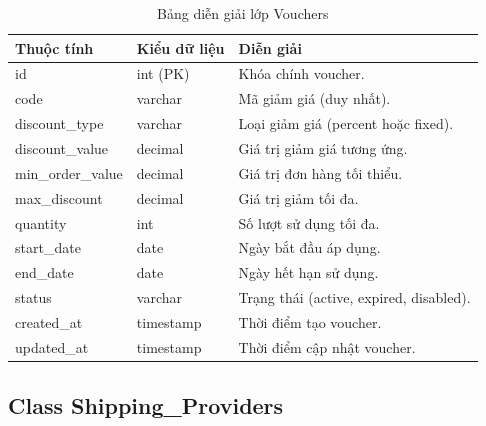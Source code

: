 \begin{table}[H]
\centering
\caption{Bảng diễn giải lớp Vouchers}
\label{tab:vouchers}
\begin{tabular}{|l|l|p{7cm}|}
\hline
\textbf{Thuộc tính} & \textbf{Kiểu dữ liệu} & \textbf{Diễn giải} \\ \hline
id & int (PK) & Khóa chính voucher. \\ \hline
code & varchar & Mã giảm giá (duy nhất). \\ \hline
discount\_type & varchar & Loại giảm giá (percent hoặc fixed). \\ \hline
discount\_value & decimal & Giá trị giảm giá tương ứng. \\ \hline
min\_order\_value & decimal & Giá trị đơn hàng tối thiểu. \\ \hline
max\_discount & decimal & Giá trị giảm tối đa. \\ \hline
quantity & int & Số lượt sử dụng tối đa. \\ \hline
start\_date & date & Ngày bắt đầu áp dụng. \\ \hline
end\_date & date & Ngày hết hạn sử dụng. \\ \hline
status & varchar & Trạng thái (active, expired, disabled). \\ \hline
created\_at & timestamp & Thời điểm tạo voucher. \\ \hline
updated\_at & timestamp & Thời điểm cập nhật voucher. \\ \hline
\end{tabular}
\end{table}

\subsection{Class Shipping\_Providers}


